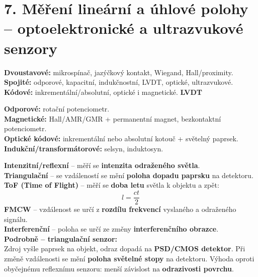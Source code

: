 \documentclass[12pt]{article}
\newcounter{chapternumber}
\newcounter{questionnumber}
\renewcommand{\thequestionnumber}{\arabic{chapternumber}.\arabic{questionnumber}}
\begin{document}
\newpage
\section*{7. Měření lineární a úhlové polohy – optoelektronické a ultrazvukové senzory}
\setcounter{chapternumber}{7}
\setcounter{questionnumber}{0}

\begin{tcolorbox}[title={\stepcounter{questionnumber}\thequestionnumber. Jaké znáte senzory lineární polohy? Vyjmenujte základní principy a jeden popište podrobněji (obrázek). (3-9)}]
\textbf{Dvoustavové:} mikrospínač, jazýčkový kontakt, Wiegand, Hall/proximity.\\
\textbf{Spojité:} odporové, kapacitní, indukčnostní, LVDT, optické, ultrazvukové.\\
\textbf{Kódové:} inkrementální/absolutní, optické i magnetické.
\textbf{LVDT} 
\end{tcolorbox}

\begin{tcolorbox}[title={\stepcounter{questionnumber}\thequestionnumber. Jaké znáte senzory úhlové polohy? Vyjmenujte základní principy a jeden popište podrobněji (obrázek). (10)}]
\textbf{Odporové:} rotační potenciometr.\\
\textbf{Magnetické:} Hall/AMR/GMR + permanentní magnet, bezkontaktní potenciometr.\\
\textbf{Optické kódové:} inkrementální nebo absolutní kotouč + světelný paprsek.\\
\textbf{Indukční/transformátorové:} selsyn, induktosyn.
\end{tcolorbox}

\begin{tcolorbox}[title={\stepcounter{questionnumber}\thequestionnumber. Jaké znáte optické senzory vzdálenosti? Vyjmenujte základní principy a jeden popište podrobněji (obrázek). (13)}]
 \textbf{Intenzitní/reflexní} -- měří se \textbf{intenzita odraženého světla}.\\
  \textbf{Triangulační} -- se vzdáleností se mění \textbf{poloha dopadu paprsku} na detektoru.\\
  \textbf{ToF (Time of Flight)} -- měří se \textbf{doba letu} světla k objektu a zpět:
  \[
  l=\frac{ct}{2}
  \]
  \textbf{FMCW} -- vzdálenost se určí z \textbf{rozdílu frekvencí} vyslaného a odraženého signálu.\\
  \textbf{Interferenční} -- poloha se určí ze změny \textbf{interferenčního obrazce}.\\

  \textbf{Podrobně -- triangulační senzor:}\\
  Zdroj vyšle paprsek na objekt, odraz dopadá na \textbf{PSD/CMOS detektor}.
  Při změně vzdálenosti se mění \textbf{poloha světelné stopy} na detektoru.
  Výhoda oproti obyčejnému reflexnímu senzoru: menší závislost na \textbf{odrazivosti povrchu}.
\end{tcolorbox}
\end{document}
